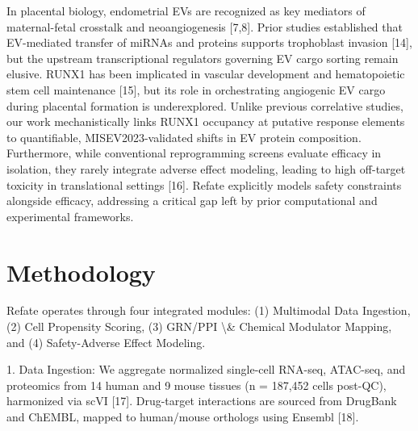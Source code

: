 \documentclass[11pt,a4paper]{article}
\begin{document}
In placental biology, endometrial EVs are recognized as key mediators of maternal-fetal crosstalk and neoangiogenesis [7,8]. Prior studies established that EV-mediated transfer of miRNAs and proteins supports trophoblast invasion [14], but the upstream transcriptional regulators governing EV cargo sorting remain elusive. RUNX1 has been implicated in vascular development and hematopoietic stem cell maintenance [15], but its role in orchestrating angiogenic EV cargo during placental formation is underexplored. Unlike previous correlative studies, our work mechanistically links RUNX1 occupancy at putative response elements to quantifiable, MISEV2023-validated shifts in EV protein composition. Furthermore, while conventional reprogramming screens evaluate efficacy in isolation, they rarely integrate adverse effect modeling, leading to high off-target toxicity in translational settings [16]. Refate explicitly models safety constraints alongside efficacy, addressing a critical gap left by prior computational and experimental frameworks.

\section{Methodology}
Refate operates through four integrated modules: (1) Multimodal Data Ingestion, (2) Cell Propensity Scoring, (3) GRN/PPI \textbackslash{}& Chemical Modulator Mapping, and (4) Safety-Adverse Effect Modeling.

1. Data Ingestion: We aggregate normalized single-cell RNA-seq, ATAC-seq, and proteomics from 14 human and 9 mouse tissues (n = 187,452 cells post-QC), harmonized via scVI [17]. Drug-target interactions are sourced from DrugBank and ChEMBL, mapped to human/mouse orthologs using Ensembl [18].
\end{document}

